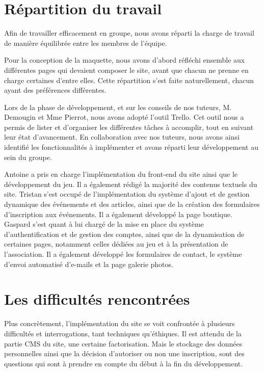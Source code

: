\section{Répartition du travail}

Afin de travailler efficacement en groupe, nous avons réparti la charge de travail de manière équilibrée entre les membres de l'équipe.

Pour la conception de la maquette, nous avons d'abord réfléchi ensemble aux différentes pages qui devaient composer le site, avant que chacun ne prenne en charge certaines d’entre elles. Cette répartition s’est faite naturellement, chacun ayant des préférences différentes.

Lors de la phase de développement, et sur les conseils de nos tuteurs, M. Demougin et Mme Pierrot, nous avons adopté l’outil Trello. Cet outil nous a permis de lister et d’organiser les différentes tâches à accomplir, tout en suivant leur état d'avancement. En collaboration avec nos tuteurs, nous avons ainsi identifié les fonctionnalités à implémenter et avons réparti leur développement au sein du groupe.

Antoine a pris en charge l’implémentation du front-end du site ainsi que le développement du jeu. Il a également rédigé la majorité des contenus textuels du site.  
Tristan s’est occupé de l’implémentation du système d’ajout et de gestion dynamique des événements et des articles, ainsi que de la création des formulaires d’inscription aux événements. Il a également développé la page boutique.  
Gaspard s’est quant à lui chargé de la mise en place du système d’authentification et de gestion des comptes, ainsi que de la dynamisation de certaines pages, notamment celles dédiées au jeu et à la présentation de l’association. Il a également développé les formulaires de contact, le système d’envoi automatisé d’e-mails et la page galerie photos.

\section{Les difficultés rencontrées}
\label{sec:difficultes}

Plus concrètement, l'implémentation du site se voit confrontée à plusieurs difficultés et interrogations, tant techniques qu'éthiques. Il est attendu de la partie CMS du site, une certaine factorisation. Mais le stockage des données personnelles ainsi que la décision d'autoriser ou non une inscription, sont des questions qui sont à prendre en compte du début à la fin du développement.

